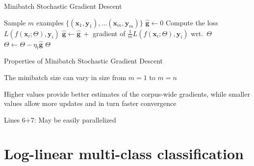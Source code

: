 \documentclass[12pt,aspectratio=169,handout]{beamer}
\begin{document}
\begin{frame}{Minibatch Stochastic Gradient Descent}
	
	\begin{algorithmic}[1]
		\State Sample $m$ examples $\{ (\bm{x}_1, \bm{y}_1), \ldots (\bm{x}_m, \bm{y}_m) \}$
		\State $\hat{\bm{g}} \gets 0$
			\State Compute the loss $L(f(\bm{x}_i; \Theta), \bm{y}_i)$
			\State $\hat{\bm{g}} \gets \hat{\bm{g}}\ + $ gradient of $\frac{1}{m} L(f(\bm{x}_i; \Theta), \bm{y}_i)$ wrt.\ $\Theta$
		\EndFor
		\State $\Theta \gets \Theta - \eta_t \hat{\bm{g}}$
		\EndWhile
		\State \Return $\Theta$
		\EndFunction
	\end{algorithmic}
	

\end{frame}

\begin{frame}{Properties of Minibatch Stochastic Gradient Descent}

The minibatch size can vary in size from $m = 1$ to $m = n$

Higher values provide better estimates of the corpus-wide gradients, while smaller values allow more updates and in turn faster convergence

Lines 6+7: May be easily parallelized

\end{frame}


\section{Log-linear multi-class classification}
\end{document}
